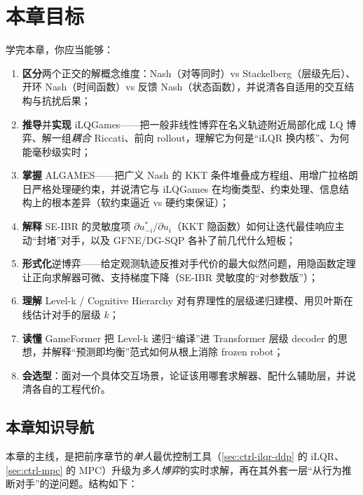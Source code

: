 \section*{本章目标}
学完本章，你应当能够：
\begin{enumerate}
  \item \textbf{区分}两个正交的解概念维度：Nash（对等同时）vs Stackelberg（层级先后）、开环 Nash（时间函数）vs 反馈 Nash（状态函数），并说清各自适用的交互结构与抗扰后果；
  \item \textbf{推导}并\textbf{实现} iLQGames——把一般非线性博弈在名义轨迹附近局部化成 LQ 博弈、解一组\emph{耦合} Riccati、前向 rollout，理解它为何是“iLQR 换内核”、为何能毫秒级实时；
  \item \textbf{掌握} ALGAMES——把广义 Nash 的 KKT 条件堆叠成方程组、用增广拉格朗日严格处理硬约束，并说清它与 iLQGames 在均衡类型、约束处理、信息结构上的根本差异（软约束逼近 vs 硬约束保证）；
  \item \textbf{解释} SE-IBR 的灵敏度项 $\partial u_{-i}^*/\partial u_i$（KKT 隐函数）如何让迭代最佳响应主动“封堵”对手，以及 GFNE/DG-SQP 各补了前几代什么短板；
  \item \textbf{形式化}逆博弈——给定观测轨迹反推对手代价的最大似然问题，用隐函数定理让正向求解器可微、支持梯度下降（SE-IBR 灵敏度的“对参数版”）；
  \item \textbf{理解} Level-k / Cognitive Hierarchy 对有界理性的层级递归建模、用贝叶斯在线估计对手的层级 $k$；
  \item \textbf{读懂} GameFormer 把 Level-k 递归“编译”进 Transformer 层级 decoder 的思想，并解释“预测即均衡”范式如何从根上消除 frozen robot；
  \item \textbf{会选型}：面对一个具体交互场景，论证该用哪套求解器、配什么辅助层，并说清各自的工程代价。
\end{enumerate}

\subsection*{本章知识导航}
本章的主线，是把前序章节的\emph{单人}最优控制工具（\cref{sec:ctrl-ilqr-ddp} 的 iLQR、\cref{sec:ctrl-mpc} 的 MPC）升级为\emph{多人博弈}的实时求解，再在其外套一层“从行为推断对手”的逆问题。结构如下：

